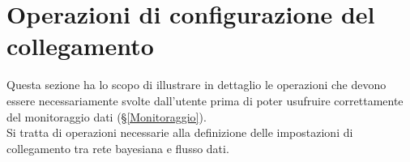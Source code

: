 \section{Operazioni di configurazione del collegamento}\label{PreMonitoraggio}
Questa sezione ha lo scopo di illustrare in dettaglio le operazioni che devono essere necessariamente svolte dall'utente prima di poter usufruire correttamente del monitoraggio dati (§\ref{Monitoraggio}).\\
Si tratta di operazioni necessarie alla definizione delle impostazioni di collegamento tra rete bayesiana e flusso dati.



\pagebreak



\pagebreak



\pagebreak



\pagebreak

